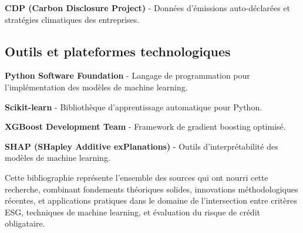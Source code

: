 \textbf{CDP (Carbon Disclosure Project)} - Données d'émissions auto-déclarées et stratégies climatiques des entreprises.

\subsection{Outils et plateformes technologiques}

\textbf{Python Software Foundation} - Langage de programmation pour l'implémentation des modèles de machine learning.

\textbf{Scikit-learn} - Bibliothèque d'apprentissage automatique pour Python.

\textbf{XGBoost Development Team} - Framework de gradient boosting optimisé.

\textbf{SHAP (SHapley Additive exPlanations)} - Outils d'interprétabilité des modèles de machine learning.

Cette bibliographie représente l'ensemble des sources qui ont nourri cette recherche, combinant fondements théoriques solides, innovations méthodologiques récentes, et applications pratiques dans le domaine de l'intersection entre critères ESG, techniques de machine learning, et évaluation du risque de crédit obligataire.
